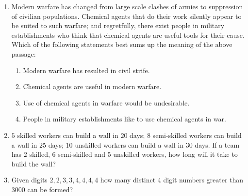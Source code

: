 \documentclass[journal,12pt,onecolumn]{IEEEtran}
\theoremstyle{remark}
\begin{document}
\begin{enumerate}
		\item Modern warfare has changed from large scale clashes of armies to suppression of civilian populations. Chemical agents that do their work silently appear to be suited to such warfare; and regretfully, there exist people in military establishments who think that chemical agents are useful tools for their cause.
		Which of the following statements best sums up the meaning of the above passage:
		\hfill{}
		
		\begin{enumerate}
			\item Modern warfare has resulted in civil strife.
			\item Chemical agents are useful in modern warfare.
			\item Use of chemical agents in warfare would be undesirable.
			\item People in military establishments like to use chemical agents in war.
		\end{enumerate}
		
		\item $5$ skilled workers can build a wall in $20$ days; $8$ semi-skilled workers can build a wall in $25$ days; $10$ unskilled workers can build a wall in $30$ days. If a team has $2$ skilled, $6$ semi-skilled and $5$ unskilled workers, how long will it take to build the wall?
		\hfill{}
		
		\begin{enumerate}
		\end{enumerate}
		
		\item Given digits $2, 2, 3, 3, 4, 4, 4, 4$ how many distinct $4$ digit numbers greater than $3000$ can be formed?
		
		\hfill{\brak{\text{GATE CS 2010}}}
		
		\begin{enumerate}
			\begin{multicols}{4}
				\item $50$
				\item $51$
				\item $52$
				\item $54$
			\end{multicols}
		\end{enumerate}
		
	\end{enumerate}
\end{document}
